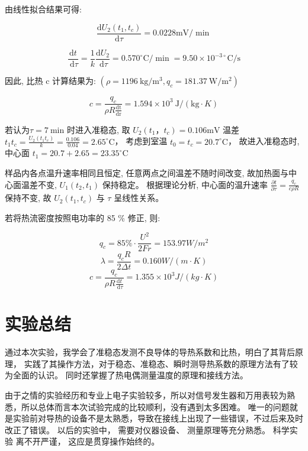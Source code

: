 \documentclass[UTF8]{ctexart}
\begin{document}
由线性拟合结果可得:

$$
\frac{\mathrm{d} U_{2}\left(t_{1} ,t_{c}\right)}{\mathrm{d} \tau}=0.0228 \mathrm{mV} / \min
$$

$$
\frac{\mathrm{d} t}{\mathrm{~d} \tau}=\frac{1}{k} \frac{\mathrm{d} U_{2}}{\mathrm{~d} \tau}=0.570^{\circ} \mathrm{C} / \min =9.50 \times 10^{-3 \circ} \mathrm{C} / \mathrm{s}
$$

因此, 比热  c  计算结果为: $\left(\rho=1196 \mathrm{~kg} / \mathrm{m}^{3}, q_{c}=181.37 \mathrm{~W} / \mathrm{m}^{2}\right) $

$$
c=\frac{q_{c}}{\rho R \frac{\mathrm{dt}}{\mathrm{dr}}}=1.594 \times 10^{3} \mathrm{~J} /(\mathrm{kg} \cdot K)
$$


 

 若认为$\tau = 7 \mathrm{~min}$  时进入准稳态, 取 $ U_{2}\left(t_{1}， t_{c}\right) = 0.106 \mathrm{mV} $
 温差 $ t_{1} t_{c} = \frac{U_{2}\left(t_{1} t_{c}\right)}{k} = \frac{0.106}{0.04} = 2.65^{\circ} \mathrm{C} $，
 考虑到室温 $ t_{0} = t_{c} = 20.7^{\circ} \mathrm{C} $，
 故进入准稳态时, 中心面 $ t_{1} = 20.7+2.65 = 23.35^{\circ} \mathrm{C} $

 样品内各点温升速率相同且恒定, 任意两点之间温差不随时间改变, 故加热面与中心面温差不变, 
$U_{1}\left(t_{2} ,t_{1}\right) $ 保持稳定。  
 根据理论分析, 中心面的温升速率 $ \frac{\partial t}{\partial \tau} = \frac{q_{c}}{c \rho R} $保持不变, 故 $U_{2} (t_{1}, t_{c}) $ 与  $\tau$  呈线性关系。  
 
 若将热流密度按照电功率的  85 \%  修正, 则:

$$
q_{c}=85 \% \cdot \frac{U^{2}}{2 F r}=153.97 W / m^{2} 
$$
$$
 \lambda=\frac{q_{c} R}{2 \Delta t}=0.160 W /(m \cdot K)
$$
$$
 c=\frac{q_{c}}{\rho R \frac{\mathrm{d} t}{\mathrm{~d} \tau}}=1.355 \times 10^{3} J /(k g \cdot K)
$$


\section{实验总结}

通过本次实验，我学会了准稳态发测不良导体的导热系数和比热，明白了其背后原理，
实践了其操作方法，对于稳态、准稳态、瞬时测导热系数的原理方法有了较为全面的认识。
同时还掌握了热电偶测量温度的原理和接线方法。

由于之情的实验经历和专业上电子实验较多，所以对信号发生器和万用表较为熟悉，所以总体而言本次试验完成的比较顺利，没有遇到太多困难。
唯一的问题就是实验前对导热的设备不是太熟悉，导致在接线上出现了一些错误，不过后来及时改正了错误。
以后的实验中， 需要对仪器设备、 测量原理等充分熟悉。 科学实验
离不开严谨， 这应是贯穿操作始终的。
\end{document}
